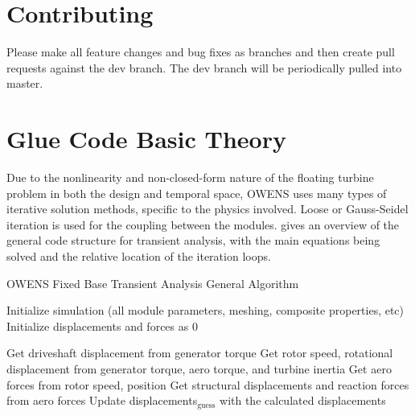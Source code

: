 \documentclass[11pt]{article}
\begin{document}

\vspace{12pt}

\section{Contributing}
Please make all feature changes and bug fixes as branches and then create pull requests against the dev branch.  The dev branch will be periodically pulled into master.

\section{Glue Code Basic Theory}

Due to the nonlinearity and non-closed-form nature of the floating turbine problem in both the design and temporal space, OWENS uses many types of iterative solution methods, specific to the physics involved.  Loose or Gauss-Seidel iteration is used for the coupling between the modules.   gives an overview of the general code structure for transient analysis, with the main equations being solved and the relative location of the iteration loops.

\begin{algorithm}
\caption{OWENS Fixed Base Transient Analysis General Algorithm}
\begin{spacing}{1.18}
\begin{algorithmic}[1]
\State Initialize simulation (all module parameters, meshing, composite properties, etc)
\State Initialize displacements and forces as 0


		\State Get driveshaft displacement from generator torque
		\State Get rotor speed, rotational displacement from generator torque, aero torque, and turbine inertia
		\State Get aero forces from rotor speed, position
		\State Get structural displacements and reaction forces from aero forces
		\State Update displacements$_\text{guess}$ with the calculated displacements
	\EndWhile
\EndFor

\end{algorithmic}
\end{spacing}
\label{alg:Transient}
\end{algorithm}
\end{document}
